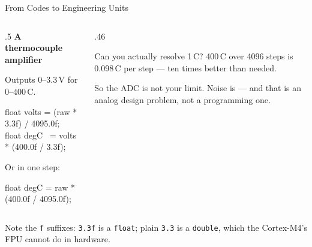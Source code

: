 \documentclass[9pt,aspectratio=169,xcolor=table]{beamer}
\begin{document}
\begin{frame}{From Codes to Engineering Units}
    \begin{columns}[T]
    \begin{column}{.5\textwidth}
        \textbf{A thermocouple amplifier}

        \vspace{1mm}
        {\small Outputs 0--3.3\,V for 0--400\,\textdegree C.}

        \vspace{2mm}
        {\ttfamily\scriptsize
        float volts = (raw * 3.3f) / 4095.0f; \\
        float degC~ = volts * (400.0f / 3.3f);}

        \vspace{2mm}
        {\small Or in one step:}

        \vspace{1mm}
        {\ttfamily\scriptsize float degC = raw * (400.0f / 4095.0f);}
    \end{column}
    \begin{column}{.46\textwidth}
        \begin{block}{Can you actually resolve 1\,\textdegree C?}
            400\,\textdegree C over 4096 steps is
            \alert{0.098\,\textdegree C per step} --- ten times better than
            needed.

            \vspace{2mm}
            So the ADC is not your limit. \alert{Noise} is --- and that is an
            analog design problem, not a programming one.
        \end{block}
    \end{column}
    \end{columns}

    \vspace{2mm}
    {\small Note the \texttt{f} suffixes: \texttt{3.3f} is a \texttt{float};
    plain \texttt{3.3} is a \texttt{double}, which the Cortex-M4's FPU
    \alert{cannot} do in hardware.}
\end{frame}
\end{document}
